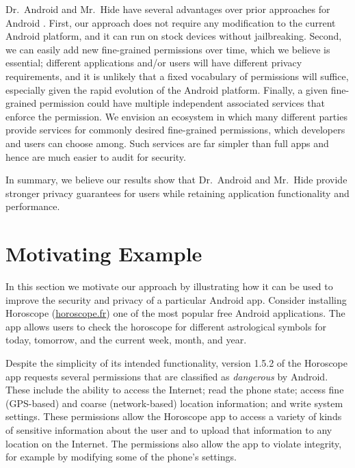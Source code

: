 \documentclass[preprint]{sig-alternate-10pt}
\newcommand{\lib}{Mr.\ Hide\xspace}
\newcommand{\rewriter}{Dr.\ Android\xspace}
\newcommand{\comment}[3][\color{red}]{}%
\newcommand{\tdm}[1]{\comment[\color{red}]{TDM}{#1}}
\begin{document}
\rewriter and \lib have several advantages over prior approaches for
Android \cite{mockdroid, apex, zhou2011taming,
  Hornyack:2011:TAD:2046707.2046780}.  First, our approach does not
require any
modification to the current Android platform, and it can run on stock
devices without jailbreaking.  Second, we can easily add new
fine-grained permissions over time, which we believe is essential;
different applications and/or users will have different privacy
requirements, and it is unlikely that a fixed vocabulary of
permissions will suffice, especially given the rapid evolution of the
Android platform. Finally, a given fine-grained permission could have
multiple independent associated services that enforce the permission.
We envision an ecosystem in which many different parties provide
services for commonly desired fine-grained permissions,
which developers and users can choose among. Such services are far
simpler than full apps and hence are much easier to audit for
security.

In summary, we believe our results show that \rewriter and \lib
provide stronger privacy guarantees for users while
retaining application functionality and performance.


\section{Motivating Example}

In this section we motivate our approach by illustrating how it can be
used to improve the security and privacy of a particular Android app.
Consider installing Horoscope
(\url{horoscope.fr})
one of the most popular free Android applications.  The app
allows users to check the horoscope for different astrological symbols
for today, tomorrow, and the current week, month, and year.

Despite the simplicity of its intended functionality,
version 1.5.2 of the Horoscope app requests several
permissions that are classified as {\em dangerous} by Android.  
These include the
ability to
access the Internet; read the phone state; access fine (GPS-based) and coarse
(network-based) location information; and write system settings.
These permissions allow the Horoscope app to access a
variety of kinds of sensitive
information about the user and to upload that information 
to any location on the Internet.  The permissions also allow the app to violate
integrity, for example by modifying some of the phone's settings.
\end{document}
